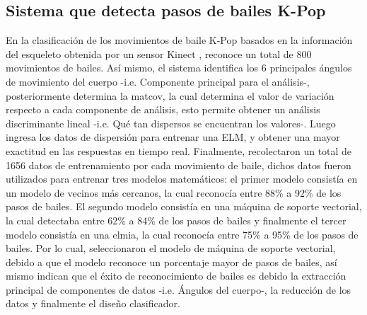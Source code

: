 \subsection{Sistema que detecta pasos de bailes K-Pop} \label{tr:9} 
En la clasificaci\'on de los movimientos de baile K-Pop basados en la informaci\'on del esqueleto obtenida por un sensor Kinect \cite{kim2017classification}, reconoce un total de 800 movimientos de bailes.
\medbreak 
As\'i mismo, el sistema identifica los 6 principales \'angulos de movimiento del cuerpo -i.e. Componente principal para el an\'alisis-, posteriormente determina la \gls{matcov}, la cual determina el valor de variaci\'on respecto a cada componente de an\'alisis,  esto permite obtener un an\'alisis discriminante lineal -i.e. Qu\'e tan dispersos se encuentran los valores-.
\medbreak 
Luego ingresa los datos de dispersi\'on para entrenar una  \acrfull{ELM}, y obtener una mayor exactitud en las respuestas en tiempo real.
\medbreak 
Finalmente,  recolectaron un total de 1656 datos de entrenamiento por cada movimiento de baile, dichos datos fueron utilizados para entrenar tres modelos matem\'aticos: el primer modelo consist\'ia en un modelo de vecinos m\'as cercanos, la cual reconoc\'ia entre 88\% a 92\% de los pasos de bailes. El segundo modelo consist\'ia en una m\'aquina de soporte vectorial, la cual detectaba entre 62\% a 84\% de los pasos de bailes y finalmente el tercer modelo consist\'ia en una \gls{elmia}, la cual reconoc\'ia entre 75\% a 95\% de los pasos de bailes.
\medbreak 
Por lo cual,   seleccionaron el modelo de m\'aquina de soporte vectorial, debido a que el modelo reconoce un porcentaje mayor de pasos de bailes, as\'i mismo indican que el \'exito de reconocimiento de bailes  es debido la extracci\'on principal de componentes de datos -i.e. \'Angulos del cuerpo-, la reducci\'on de los datos y finalmente  el dise\~no clasificador.
